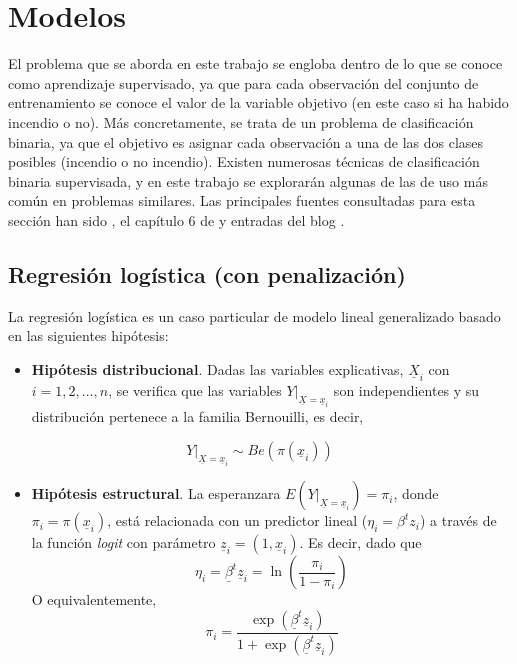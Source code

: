 \documentclass[12pt,a4paper,]{book}
\providecommand{\tightlist}{%
  \setlength{\itemsep}{0pt}\setlength{\parskip}{0pt}}
\numberwithin{dummy}{section}
\theoremstyle{ocrenumbox}
\theoremstyle{blacknumex}
\theoremstyle{blacknumbox}
\theoremstyle{ocrenum}
\theoremstyle{ocrenum}
\begin{document}
\hypertarget{modelos}{%
\section{Modelos}\label{modelos}}

El problema que se aborda en este trabajo se engloba dentro de lo que se
conoce como aprendizaje supervisado, ya que para cada observación del
conjunto de entrenamiento se conoce el valor de la variable objetivo (en
este caso si ha habido incendio o no). Más concretamente, se trata de un
problema de clasificación binaria, ya que el objetivo es asignar cada
observación a una de las dos clases posibles (incendio o no incendio).
Existen numerosas técnicas de clasificación binaria supervisada, y en
este trabajo se explorarán algunas de las de uso más común en problemas
similares. Las principales fuentes consultadas para esta sección han
sido \citet{hastie2009elements}, el capítulo 6 de
\citet{MLmodelSuthaharan} y entradas del blog \citet{eight2late}.

\hypertarget{regresiuxf3n-loguxedstica-con-penalizaciuxf3n}{%
\subsection{Regresión logística (con
penalización)}\label{regresiuxf3n-loguxedstica-con-penalizaciuxf3n}}

La regresión logística es un caso particular de modelo lineal
generalizado basado en las siguientes hipótesis:

\begin{itemize}
\tightlist
\item
  \textbf{Hipótesis distribucional}. Dadas las variables explicativas,
  \(\underline X_i\) con \(i = 1,2,...,n\), se verifica que las
  variables \(Y|_{\underline X= \underline x_i}\) son independientes y
  su distribución pertenece a la familia Bernouilli, es decir,
\end{itemize}

\[Y|_{\underline X= \underline x_i} \sim Be(\pi( \underline x_i))\]

\begin{itemize}
\tightlist
\item
  \textbf{Hipótesis estructural}. La esperanzara
  \(E(Y|_{\underline X = \underline x_i}) = \pi_i\), donde
  \(\pi_i = \pi( \underline x_i)\), está relacionada con un predictor
  lineal (\(\eta_i = \beta^t z_i\)) a través de la función \emph{logit}
  con parámetro \(\underline z_i = \left(1,\underline x_i\right)\). Es
  decir, dado que
  \[\eta_i = \underline \beta^t \underline z_i= \ln\left(\frac{\pi_i}{1-\pi_i}\right)\]
  O equivalentemente,
  \[\pi_i = \frac{\exp(\underline \beta^t \underline z_i)}{1 + \exp(\underline \beta^t \underline z_i)}\]
\end{itemize}
\end{document}
